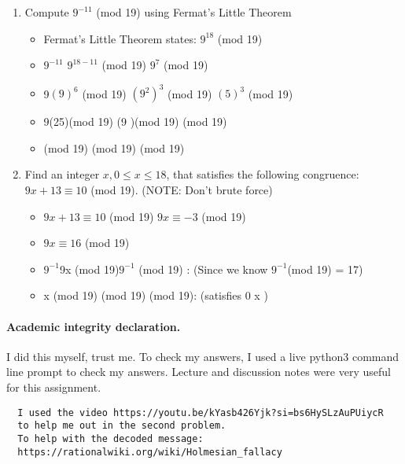 \documentclass[11pt]{article}
\newcounter{prnum}
\newenvironment{problem}{{\vskip 0.2in\noindent\bf Problem
       \addtocounter{prnum}{1} \arabic{prnum}.}}{\vskip 0.1in}
\begin{document}
\begin{problem}
\begin{enumerate}
    \item Compute $9^{-11}$ (mod 19) using Fermat's Little Theorem
      \begin{itemize}
        \item Fermat's Little Theorem states: $9^{18}$  (mod 19)
        \item $9^{-11}$ \equiv $9^{18-11}$ (mod 19) \equiv\space $9^7$ (mod 19)
        \item 9\cdot$(9)^6$ (mod 19) \cdot$(9^2)^3$ (mod 19) \cdot$(5)^3$ (mod 19)
        \item 9\cdot (25)(mod 19) \equiv (9 )(mod 19) (mod 19) 
        \item{} (mod 19)  (mod 19)  (mod 19)
      \end{itemize}
    \item Find an integer $x, 0 \leq x \leq 18$, that satisfies
      the following congruence: $9x + 13 \equiv 10$ (mod 19). (NOTE: Don't brute force)
      \begin{itemize}
        
        \item $9x + 13 \equiv 10$ (mod 19) \Rightarrow $9x \equiv -3$ (mod 19)
        \item \Rightarrow\space $9x \equiv 16$ (mod 19)
        \item $9^{-1}$\cdot 9x (mod 19)\cdot$9^{-1}$ (mod 19) : (Since we know $9^{-1}$(mod 19) = 17)
        \item x  (mod 19) \equiv{} (mod 19) \equiv{} (mod 19): (satisfies 0 \leq x )
      \end{itemize}
  \end{enumerate}
\end{problem}


\vskip 0.2in
\paragraph{Academic integrity declaration.}
I did this myself, trust me. To check my answers, I used a live python3 command line prompt to check my answers.
Lecture and discussion notes were very useful for this assignment. 
\begin{verbatim}
  I used the video https://youtu.be/kYasb426Yjk?si=bs6HySLzAuPUiycR 
  to help me out in the second problem.
  To help with the decoded message:
  https://rationalwiki.org/wiki/Holmesian_fallacy
\end{verbatim}
\end{document}
